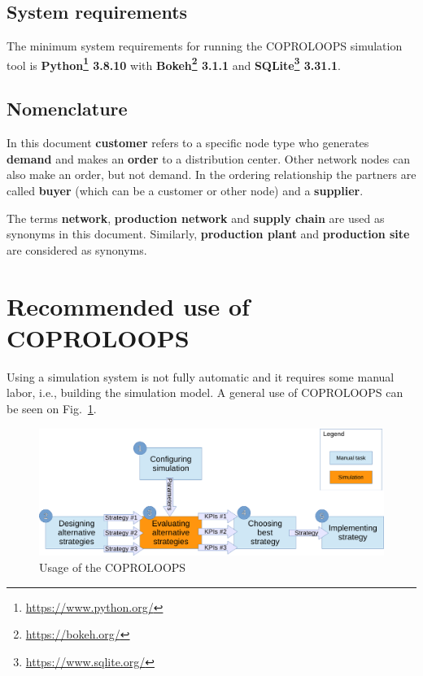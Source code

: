 \documentclass{article}
\newcommand{\NAME}{COPROLOOPS }
\begin{document}
\subsection{System requirements}

The minimum system requirements for running the \NAME simulation tool is \textbf{Python\footnote{\href{https://www.python.org/}{https://www.python.org/}} 3.8.10} with \textbf{Bokeh\footnote{\href{https://bokeh.org/}{https://bokeh.org/}} 3.1.1} and \textbf{SQLite\footnote{\href{https://www.sqlite.org/}{https://www.sqlite.org/}} 3.31.1}.


\subsection{Nomenclature}

In this document \textbf{customer} refers to a specific node type who generates \textbf{demand} and makes an \textbf{order} to a distribution center. Other network nodes can also make an order, but not demand. In the ordering relationship the partners are called \textbf{buyer} (which can be a customer or other node) and a \textbf{supplier}.

The terms \textbf{network}, \textbf{production network} and \textbf{supply chain} are used as synonyms in this document. Similarly, \textbf{production plant} and \textbf{production site} are considered as synonyms.


\section{Recommended use of \NAME}

Using a simulation system is not fully automatic and it requires some manual labor, i.e., building the simulation model. A general use of \NAME can be seen on Fig.~\ref{fig:usage}.

\begin{figure}[ht!]
	\center
	\includegraphics[width=\textwidth]{usage-crop.pdf} 
	\caption{Usage of the \NAME}\label{fig:usage}
\end{figure}
\end{document}
